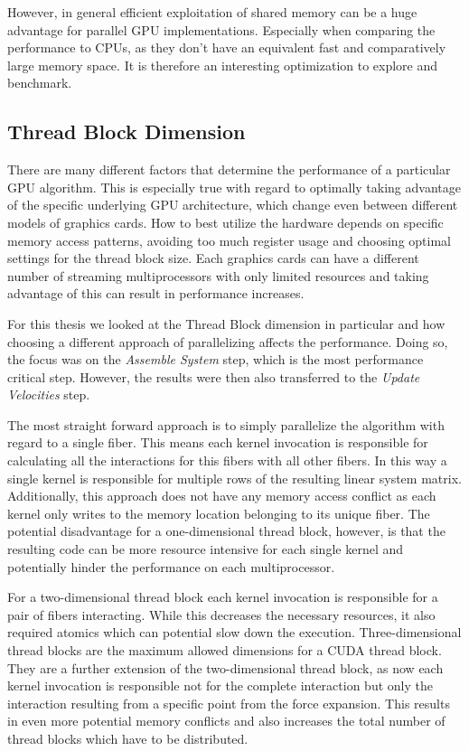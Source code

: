 \documentclass[a4paper,11pt]{kth-mag}
\begin{document}
However, in general efficient exploitation of shared memory can be a huge advantage for parallel GPU implementations. Especially when comparing the performance to CPUs, as they don't have an equivalent fast and comparatively large memory space. It is therefore an interesting optimization to explore and benchmark.

\subsection{Thread Block Dimension}

There are many different factors that determine the performance of a particular GPU algorithm. This is especially true with regard to optimally taking advantage of the specific underlying GPU architecture, which change even between different models of graphics cards. How to best utilize the hardware depends on specific memory access patterns, avoiding too much register usage and choosing optimal settings for the thread block size. Each graphics cards can have a different number of streaming multiprocessors with only limited resources and taking advantage of this can result in performance increases.

For this thesis we looked at the Thread Block dimension in particular and how choosing a different approach of parallelizing affects the performance. Doing so, the focus was on the \emph{Assemble System} step, which is the most performance critical step. However, the results were then also transferred to the \emph{Update Velocities} step.

The most straight forward approach is to simply parallelize the algorithm with regard to a single fiber. This means each kernel invocation is responsible for calculating all the interactions for this fibers with all other fibers. In this way a single kernel is responsible for multiple rows of the resulting linear system matrix. Additionally, this approach does not have any memory access conflict as each kernel only writes to the memory location belonging to its unique fiber. The potential disadvantage for a one-dimensional thread block, however, is that the resulting code can be more resource intensive for each single kernel and potentially hinder the performance on each multiprocessor.

For a two-dimensional thread block each kernel invocation is responsible for a pair of fibers interacting. While this decreases the necessary resources, it also required atomics which can potential slow down the execution. Three-dimensional thread blocks are the maximum allowed dimensions for a CUDA thread block. They are a further extension of the two-dimensional thread block, as now each kernel invocation is responsible not for the complete interaction but only the interaction resulting from a specific point from the force expansion. This results in even more potential memory conflicts and also increases the total number of thread blocks which have to be distributed.
\end{document}
